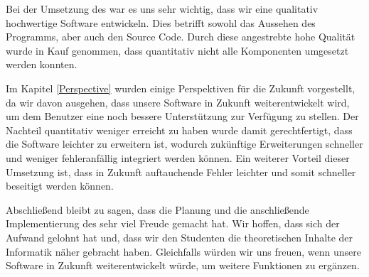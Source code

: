 Bei der Umsetzung des \gtitools war es uns sehr wichtig, dass wir eine
qualitativ hochwertige Software entwickeln. Dies betrifft sowohl das
Aussehen des Programms, aber auch den Source Code. Durch diese angestrebte hohe
Qualität wurde in Kauf genommen, dass quantitativ nicht alle Komponenten
umgesetzt werden konnten.\vspace{10pt}

Im Kapitel \ref{Perspective} wurden einige Perspektiven für die Zukunft
vorgestellt, da wir davon ausgehen, dass unsere Software in Zukunft
weiterentwickelt wird, um dem Benutzer eine noch bessere Unterstützung zur
Verfügung zu stellen. Der Nachteil quantitativ weniger erreicht zu haben wurde
damit gerechtfertigt, dass die Software leichter zu erweitern ist, wodurch
zukünftige Erweiterungen schneller und weniger fehleranfällig integriert werden
können. Ein weiterer Vorteil dieser Umsetzung ist, dass in Zukunft auftauchende
Fehler leichter und somit schneller beseitigt werden können.\vspace{10pt}

Abschließend bleibt zu sagen, dass die Planung und die anschließende
Implementierung des \gtitools sehr viel Freude gemacht hat. Wir hoffen, dass sich
der Aufwand gelohnt hat und, dass wir den Studenten die theoretischen Inhalte der
Informatik näher gebracht haben. Gleichfalls würden wir uns freuen, wenn unsere
Software in Zukunft weiterentwickelt würde, um weitere Funktionen zu
ergänzen.\vspace{10pt}


